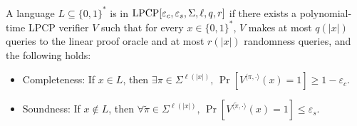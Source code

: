 \begin{definition}
\label{LPCP}
\leanok
A language $L \subseteq \{0,1\}^*$ is in
$\mathrm{LPCP}[\varepsilon_c, \varepsilon_s, \Sigma, \ell, q, r]$
if there exists a polynomial-time LPCP verifier $V$
such that for every $x \in \{0,1\}^*$,
$V$ makes at most $q(|x|)$ queries to the linear proof oracle and
at most $r(|x|)$ randomness queries, and the following holds:
\begin{itemize}
  \item Completeness: If $x \in L$, then
  $\exists \pi \in \Sigma^{\ell(|x|)}, \,
  \Pr\left[V^{\langle \pi, \cdot \rangle}(x)=1 \right]
  \geq 1 - \varepsilon_c$.
  \item Soundness: If $x \notin L$, then
  $\forall \widetilde{\pi} \in \Sigma^{\ell(|x|)},\,
  \Pr\left[V^{\langle \widetilde{\pi}, \cdot \rangle}(x)=1 \right]
  \leq \varepsilon_s$.
\end{itemize}
\end{definition}
